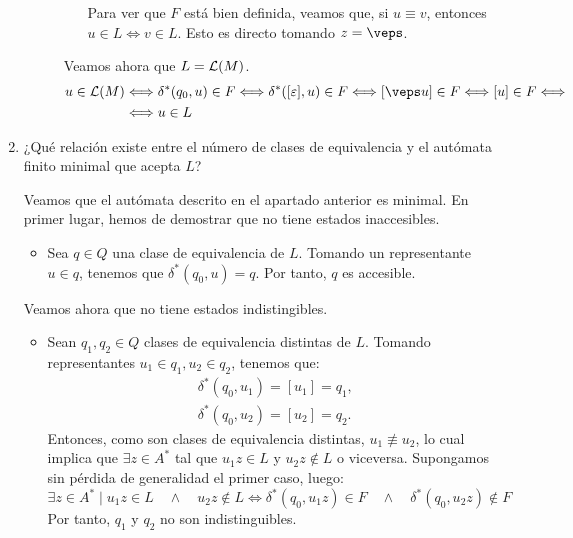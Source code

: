 \begin{ejercicio}
\begin{enumerate}
\begin{description}
\begin{itemize}
                Para ver que $F$ está bien definida, veamos que, si $u\equiv v$, entonces $u\in L\Longleftrightarrow v\in L$.
                Esto es directo tomando $z=\veps$.
            \end{itemize}

            Veamos ahora que $L=\mathcal{L}(M)$.
            \begin{align*}
                u\in \cc{L}(M)&\Longleftrightarrow \delta^{\ast}(q_0, u)\in F\Longleftrightarrow \delta^{\ast}([\varepsilon], u)\in F\Longleftrightarrow [\veps u]\in F\Longleftrightarrow [u]\in F \Longleftrightarrow \\ &\Longleftrightarrow u\in L
            \end{align*}

        \end{description}
        \item ¿Qué relación existe entre el número de clases de equivalencia y el autómata finito minimal que acepta $L$?
        
        Veamos que el autómata descrito en el apartado anterior es minimal. En primer lugar, hemos de demostrar que no tiene estados inaccesibles.
        \begin{itemize}
            \item Sea $q\in Q$ una clase de equivalencia de $L$. Tomando un representante $u\in q$, tenemos que $\delta^{\ast}(q_0, u)=q$. Por tanto, $q$ es accesible.
        \end{itemize}

        Veamos ahora que no tiene estados indistingibles.
        \begin{itemize}
            \item Sean $q_1,q_2\in Q$ clases de equivalencia distintas de $L$. Tomando representantes $u_1\in q_1,u_2\in q_2$, tenemos que:
            \begin{align*}
                \delta^{\ast}(q_0, u_1)=[u_1]=q_1,\\
                \delta^{\ast}(q_0, u_2)=[u_2]=q_2.
            \end{align*}
            Entonces, como son clases de equivalencia distintas, $u_1\not\equiv u_2$, lo cual implica que $\exists z\in A^*$ tal que $u_1z\in L$ y $u_2z\notin L$ o viceversa. Supongamos sin pérdida de generalidad el primer caso, luego:
            \begin{equation*}
                \exists z\in A^*\mid u_1z\in L\quad \land \quad u_2z\notin L
                \Longleftrightarrow
                \delta^{\ast}(q_0, u_1z)\in F\quad \land \quad \delta^{\ast}(q_0, u_2z)\notin F
            \end{equation*}
            Por tanto, $q_1$ y $q_2$ no son indistinguibles.
        \end{itemize}


\end{enumerate}
\end{ejercicio}
